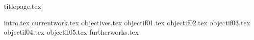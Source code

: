 \documentclass[twoside, twocolumn]{article}
\begin{document}
{titlepage.tex}

{intro.tex}
{currentwork.tex}
{objectives.tex}
{objectif01.tex}
{objectif02.tex}
{objectif03.tex}
{objectif04.tex}
{objectif05.tex}
{furtherworks.tex}

\nocite{*}\printbibliography[heading=bibintoc, title={References}]
\end{document}
